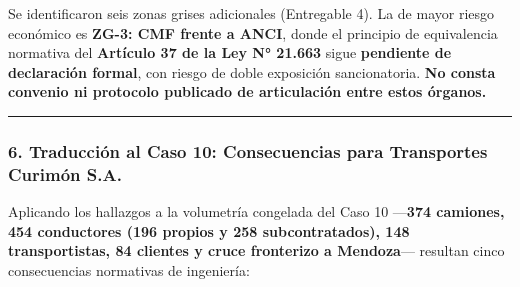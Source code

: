 Se identificaron seis zonas grises adicionales (Entregable 4). La de mayor riesgo económico es \textbf{ZG-3: CMF frente a ANCI}, donde el principio de equivalencia normativa del \textbf{Artículo 37 de la Ley N° 21.663} sigue \textbf{pendiente de declaración formal}, con riesgo de doble exposición sancionatoria. \textbf{No consta convenio ni protocolo publicado de articulación entre estos órganos.}

\begin{center}\rule{0.5\linewidth}{0.5pt}\end{center}

\subsubsection{6. Traducción al Caso 10: Consecuencias para Transportes Curimón S.A.}\label{traducciuxf3n-al-caso-10-consecuencias-para-transportes-curimuxf3n-s.a.}

Aplicando los hallazgos a la volumetría congelada del Caso 10 ---\textbf{374 camiones, 454 conductores (196 propios y 258 subcontratados), 148 transportistas, 84 clientes y cruce fronterizo a Mendoza}--- resultan cinco consecuencias normativas de ingeniería:

